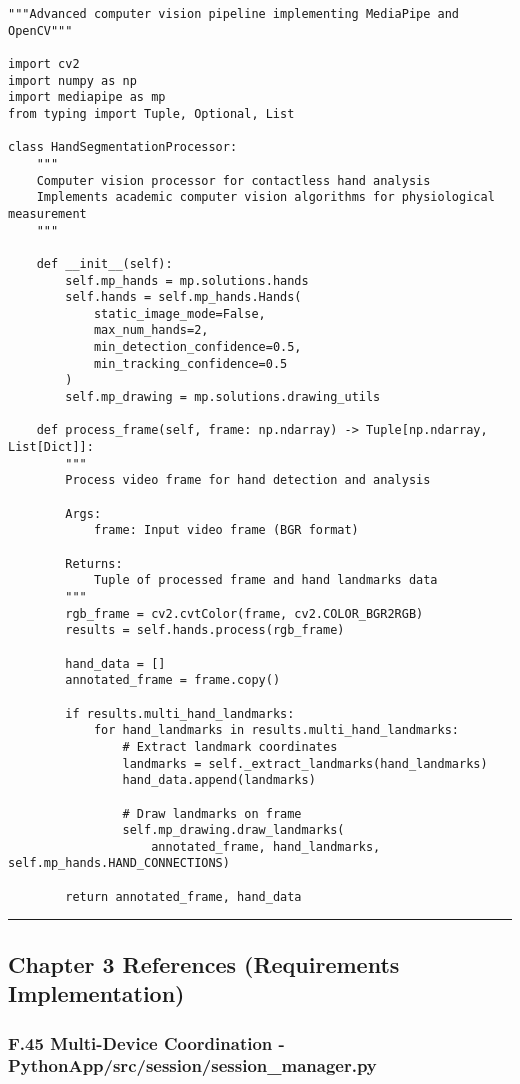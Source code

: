 \documentclass[12pt,a4paper]{article}
\begin{document}
\begin{verbatim}
"""Advanced computer vision pipeline implementing MediaPipe and OpenCV"""

import cv2
import numpy as np
import mediapipe as mp
from typing import Tuple, Optional, List

class HandSegmentationProcessor:
    """
    Computer vision processor for contactless hand analysis
    Implements academic computer vision algorithms for physiological measurement
    """
    
    def __init__(self):
        self.mp_hands = mp.solutions.hands
        self.hands = self.mp_hands.Hands(
            static_image_mode=False,
            max_num_hands=2,
            min_detection_confidence=0.5,
            min_tracking_confidence=0.5
        )
        self.mp_drawing = mp.solutions.drawing_utils
        
    def process_frame(self, frame: np.ndarray) -> Tuple[np.ndarray, List[Dict]]:
        """
        Process video frame for hand detection and analysis
        
        Args:
            frame: Input video frame (BGR format)
            
        Returns:
            Tuple of processed frame and hand landmarks data
        """
        rgb_frame = cv2.cvtColor(frame, cv2.COLOR_BGR2RGB)
        results = self.hands.process(rgb_frame)
        
        hand_data = []
        annotated_frame = frame.copy()
        
        if results.multi_hand_landmarks:
            for hand_landmarks in results.multi_hand_landmarks:
                # Extract landmark coordinates
                landmarks = self._extract_landmarks(hand_landmarks)
                hand_data.append(landmarks)
                
                # Draw landmarks on frame
                self.mp_drawing.draw_landmarks(
                    annotated_frame, hand_landmarks, self.mp_hands.HAND_CONNECTIONS)
        
        return annotated_frame, hand_data
\end{verbatim}

\hrule

\subsection{Chapter 3 References (Requirements Implementation)}

\subsubsection{F.45 Multi-Device Coordination - PythonApp/src/session/session_manager.py}
\end{document}
